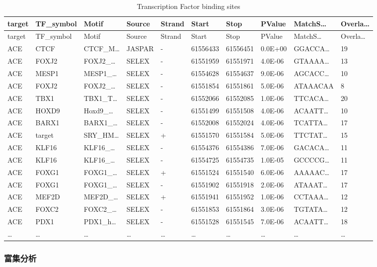 \documentclass[
]{article}
\begin{document}
\begin{longtable}[]{@{}llllllllll@{}}
\caption{\label{tab:Transcription-Factor-binding-sites}Transcription Factor binding sites}\tabularnewline
\toprule
target & TF\_symbol & Motif & Source & Strand & Start & Stop & PValue & MatchS\ldots{} & Overla\ldots{}\tabularnewline
\midrule
\endfirsthead
\toprule
target & TF\_symbol & Motif & Source & Strand & Start & Stop & PValue & MatchS\ldots{} & Overla\ldots{}\tabularnewline
\midrule
\endhead
ACE & CTCF & CTCF\_M\ldots{} & JASPAR & - & 61556433 & 61556451 & 0.0E+00 & GGACCA\ldots{} & 19\tabularnewline
ACE & FOXJ2 & FOXJ2\_\ldots{} & SELEX & - & 61551959 & 61551971 & 4.0E-06 & GTAAAA\ldots{} & 13\tabularnewline
ACE & MESP1 & MESP1\_\ldots{} & SELEX & - & 61554628 & 61554637 & 9.0E-06 & AGCACC\ldots{} & 10\tabularnewline
ACE & FOXJ2 & FOXJ2\_\ldots{} & SELEX & - & 61551854 & 61551861 & 5.0E-06 & ATAAACAA & 8\tabularnewline
ACE & TBX1 & TBX1\_T\ldots{} & SELEX & - & 61552066 & 61552085 & 1.0E-06 & TTCACA\ldots{} & 20\tabularnewline
ACE & HOXD9 & Hoxd9\_\ldots{} & SELEX & - & 61551499 & 61551508 & 4.0E-06 & ACAATT\ldots{} & 10\tabularnewline
ACE & BARX1 & BARX1\_\ldots{} & SELEX & - & 61552008 & 61552024 & 4.0E-06 & TCATTA\ldots{} & 17\tabularnewline
ACE & target & SRY\_HM\ldots{} & SELEX & + & 61551570 & 61551584 & 5.0E-06 & TTCTAT\ldots{} & 15\tabularnewline
ACE & KLF16 & KLF16\_\ldots{} & SELEX & - & 61554376 & 61554386 & 7.0E-06 & GACACA\ldots{} & 11\tabularnewline
ACE & KLF16 & KLF16\_\ldots{} & SELEX & - & 61554725 & 61554735 & 1.0E-05 & GCCCCG\ldots{} & 11\tabularnewline
ACE & FOXG1 & FOXG1\_\ldots{} & SELEX & + & 61551524 & 61551540 & 6.0E-06 & AAAAAC\ldots{} & 17\tabularnewline
ACE & FOXG1 & FOXG1\_\ldots{} & SELEX & - & 61551902 & 61551918 & 2.0E-06 & ATAAAT\ldots{} & 17\tabularnewline
ACE & MEF2D & MEF2D\_\ldots{} & SELEX & + & 61551941 & 61551952 & 1.0E-06 & CCTAAA\ldots{} & 12\tabularnewline
ACE & FOXC2 & FOXC2\_\ldots{} & SELEX & - & 61551853 & 61551864 & 3.0E-06 & TGTATA\ldots{} & 12\tabularnewline
ACE & PDX1 & PDX1\_h\ldots{} & SELEX & - & 61551528 & 61551545 & 7.0E-06 & ACAATT\ldots{} & 18\tabularnewline
\ldots{} & \ldots{} & \ldots{} & \ldots{} & \ldots{} & \ldots{} & \ldots{} & \ldots{} & \ldots{} & \ldots{}\tabularnewline
\bottomrule
\end{longtable}

\hypertarget{en}{%
\subsubsection{富集分析}\label{en}}
\end{document}
